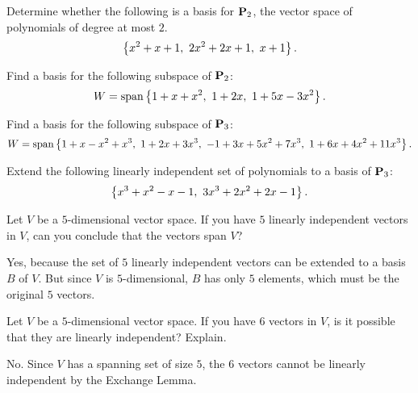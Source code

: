 \begin{ex}
  Determine whether the following is a basis for $\mathbf{P}_{2}$, the
  vector space of polynomials of degree at most $2$.
  \begin{equation*}
    \left\{x^2+x+1,~2x^2+2x+1,~x+1\right\}.
  \end{equation*}
\end{ex}

\begin{ex}
  Find a basis for the following subspace of $\mathbf{P}_{2}$:
  \begin{equation*}
    W=\sspan\set{1+x+x^2,~1+2x,~1+5x-3x^2}.
  \end{equation*}
\end{ex}

\begin{ex}
  Find a basis for the following subspace of $\mathbf{P}_{3}$:
  \begin{equation*}
    W = \sspan\set{
      1+x-x^2+x^3,~1+2x+3x^3,~-1+3x+5x^2+7x^3,~1+6x+4x^2+11x^3}.
  \end{equation*}
\end{ex}

\begin{ex}
  Extend the following linearly independent set of polynomials to a
  basis of $\mathbf{P}_3$:
  \begin{equation*}
    \left\{x^3+x^2-x-1,~3x^3+2x^2+2x-1\right\}.
  \end{equation*}
\end{ex}

\begin{ex}
  Let $V$ be a $5$-dimensional vector space.
  If you have $5$ linearly independent vectors in $V$, can you
  conclude that the vectors span $V$?
  \begin{sol}
    Yes, because the set of $5$ linearly independent vectors can be
    extended to a basis $B$ of $V$. But since $V$ is $5$-dimensional,
    $B$ has only $5$ elements, which must be the original $5$ vectors.
  \end{sol}
\end{ex}

\begin{ex}
  Let $V$ be a $5$-dimensional vector space.  If you have $6$ vectors
  in $V$, is it possible that they are linearly independent? Explain.
  \begin{sol}
    No. Since $V$ has a spanning set of size $5$, the $6$ vectors
    cannot be linearly independent by the Exchange Lemma.
  \end{sol}
\end{ex}


